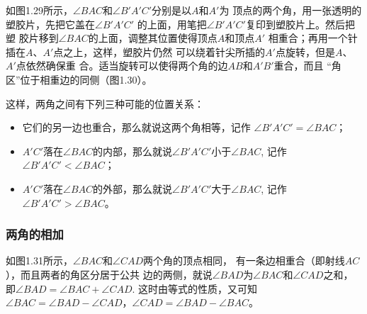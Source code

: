 如图1.29所示，$\angle BAC$和$\angle B'A'C'$分别是以$A$和$A'$为
顶点的两个角，用一张透明的塑胶片，先把它盖在$\angle B'A'C'$
的上面，用笔把$\angle B'A'C'$复印到塑胶片上。然后把塑
胶片移到$\angle BAC$的上面，调整其位置使得顶点$A$和顶点$A'$
相重合；再用一个针插在$A$、$A'$点之上，这样，塑胶片仍然
可以绕着针尖所插的$A'$点旋转，但是$A$、$A'$点依然确保重
合。适当旋转可以使得两个角的边$AB$和$A'B'$重合，而且
“角区”位于相重边的同侧（图1.30）。
\begin{figure}[htp]\centering
    \begin{minipage}[t]{0.48\textwidth}
    \centering
{}
    \caption{}
    \end{minipage}
    \begin{minipage}[t]{0.48\textwidth}
    \centering
    \caption{}
    \end{minipage}
    \end{figure}


这样，两角之间有下列三种可能的位置关系：
\begin{itemize}
	\item 它们的另一边也重合，那么就说这两个角相等，记作
	$\angle B'A'C'=\angle BAC$；
	\item $A'C'$落在$\angle BAC$的内部，那么就说$\angle B'A'C'$小于$\angle BAC$, 记作$\angle B'A'C'<\angle BAC$；
	\item $A'C'$落在$\angle BAC$的外部，那么就说$\angle B'A'C'$大于$\angle BAC$, 记作$\angle B'A'C'>\angle BAC$。
\end{itemize}

\subsubsection{两角的相加}
如图1.31所示，$\angle BAC$和$\angle CAD$两个角的顶点相同，
有一条边相重合（即射线$AC$），而且两者的角区分居于公共
边的两侧，就说$\angle BAD$为$\angle BAC$和$\angle CAD$之和，即$\angle BAD=\angle BAC+\angle CAD$. 这时由等式的性质，又可知$\angle BAC=\angle BAD-\angle CAD$，$\angle CAD=\angle BAD-\angle BAC$。


